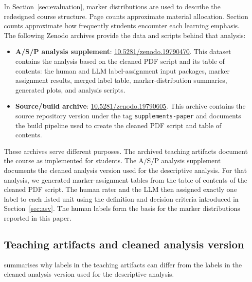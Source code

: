 \documentclass{article}
\begin{document}
In Section~\ref{sec:evaluation}, marker distributions are used to describe the redesigned course structure. Page counts approximate material allocation. Section counts approximate how frequently students encounter each learning emphasis. The following Zenodo archives provide the data and scripts behind that analysis:\par
\begin{itemize}[leftmargin=*]
  \item \textbf{A/S/P analysis supplement}: \href{https://doi.org/10.5281/zenodo.19790470}{10.5281/zenodo.19790470}. This dataset contains the analysis based on the cleaned PDF script and its table of contents: the human and LLM label-assignment input packages, marker assignment results, merged label table, marker-distribution summaries, generated plots, and analysis scripts.\vspace{-1mm}
  \item \textbf{Source/build archive}: \href{https://doi.org/10.5281/zenodo.19790605}{10.5281/zenodo.19790605}. This archive contains the source repository version under the tag \texttt{supplements-paper} and documents the build pipeline used to create the cleaned PDF script and table of contents.
\end{itemize}
\vspace{-1mm}
These archives serve different purposes. The archived teaching artifacts document the course as implemented for students. The A/S/P analysis supplement documents the cleaned analysis version used for the descriptive analysis. For that analysis, we generated marker-assignment tables from the table of contents of the cleaned PDF script. The human rater and the LLM then assigned exactly one label to each listed unit using the definition and decision criteria introduced in Section~\ref{sec:asv}. The human labels form the basis for the marker distributions reported in this paper.

\subsection{Teaching artifacts and cleaned analysis version}
\label{app:teaching-vs-analysis-version}

 summarises why labels in the teaching artifacts can differ from the labels in the cleaned analysis version used for the descriptive analysis.
\end{document}
